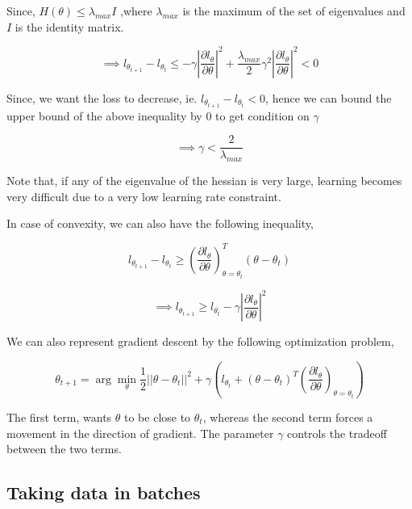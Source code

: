 \documentclass[11pt, twosides]{article}
\begin{document}
Since, $H(\theta) \leq \lambda_{max} I$ ,where $\lambda_{max}$ is the maximum of the set of eigenvalues and $I$ is the identity matrix. 

\begin{equation}
    \implies  l_{\theta_{t+1}} - l_{\theta_{t}} \leq -\gamma \left|\frac{\partial  l_{\theta}}{\partial \theta}\right|^2 + \frac{\lambda_{max}}{2}\gamma^2\left|\frac{\partial  l_{\theta}}{\partial \theta}\right|^2 < 0
\end{equation}

Since, we want the loss to decrease, ie. $l_{\theta_{t+1}} - l_{\theta_{t}} <0 $, hence we can bound the upper bound of the above inequality by 0 to get condition on $\gamma$

\begin{equation}
    \implies \gamma < \frac{2}{\lambda_{max}}
\end{equation}

Note that, if any of the eigenvalue of the hessian is very large, learning becomes very difficult due to a very low learning rate constraint. 

In case of convexity, we can also have the following inequality, 

\begin{equation}
    l_{\theta_{t+1}} - l_{\theta_{t}} \geq \left(\frac{\partial  l_{\theta}}{\partial \theta} \right)_{\theta = \theta_{t}}^{T}(\theta - \theta_{t})
\end{equation}

\begin{equation}
    \implies l_{\theta_{t+1}} \geq  l_{\theta_{t}} -\gamma\left|\frac{\partial  l_{\theta}}{\partial \theta}\right|^2
\end{equation}


We can also represent gradient descent by the following optimization problem, 

\begin{equation}
    \theta_{t+1} = \arg \min_{\theta} \frac{1}{2}||\theta - \theta_{t}||^2 + \gamma\left( l_{\theta_{t}} + (\theta - \theta_{t})^{T}\left(\frac{\partial  l_{\theta}}{\partial \theta} \right)_{\theta = \theta_{t}}\right)
\end{equation}

The first term, wants $\theta$ to be close to $\theta_{t}$, whereas the second term forces a movement in the direction of gradient. The parameter $\gamma$ controls the tradeoff between the two terms. 


\subsection{Taking data in batches}
\end{document}
